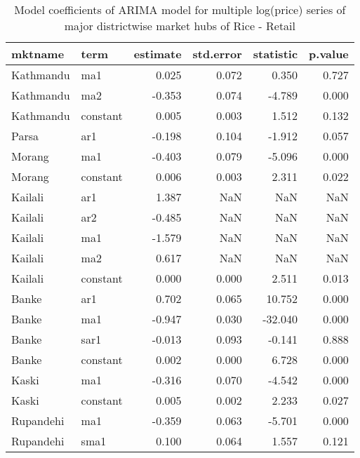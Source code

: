\documentclass[12pt,]{article}
\begin{document}
\begin{table}

\caption{\label{tab:multiple-arima-summary}Model coefficients of ARIMA model for multiple log(price) series of major districtwise market hubs of Rice - Retail}
\centering
\begin{tabular}[t]{llrrrr}
\toprule
mktname & term & estimate & std.error & statistic & p.value\\
\midrule
Kathmandu & ma1 & 0.025 & 0.072 & 0.350 & 0.727\\
Kathmandu & ma2 & -0.353 & 0.074 & -4.789 & 0.000\\
Kathmandu & constant & 0.005 & 0.003 & 1.512 & 0.132\\
Parsa & ar1 & -0.198 & 0.104 & -1.912 & 0.057\\
Morang & ma1 & -0.403 & 0.079 & -5.096 & 0.000\\
\addlinespace
Morang & constant & 0.006 & 0.003 & 2.311 & 0.022\\
Kailali & ar1 & 1.387 & NaN & NaN & NaN\\
Kailali & ar2 & -0.485 & NaN & NaN & NaN\\
Kailali & ma1 & -1.579 & NaN & NaN & NaN\\
Kailali & ma2 & 0.617 & NaN & NaN & NaN\\
\addlinespace
Kailali & constant & 0.000 & 0.000 & 2.511 & 0.013\\
Banke & ar1 & 0.702 & 0.065 & 10.752 & 0.000\\
Banke & ma1 & -0.947 & 0.030 & -32.040 & 0.000\\
Banke & sar1 & -0.013 & 0.093 & -0.141 & 0.888\\
Banke & constant & 0.002 & 0.000 & 6.728 & 0.000\\
\addlinespace
Kaski & ma1 & -0.316 & 0.070 & -4.542 & 0.000\\
Kaski & constant & 0.005 & 0.002 & 2.233 & 0.027\\
Rupandehi & ma1 & -0.359 & 0.063 & -5.701 & 0.000\\
Rupandehi & sma1 & 0.100 & 0.064 & 1.557 & 0.121\\
\bottomrule
\end{tabular}
\end{table}
\end{document}
